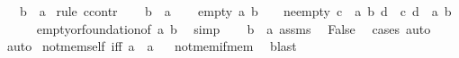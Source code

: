 \begin{isabellebody}
\ \ \ {\isachardoublequoteopen}b\ {\isasymnotin}\ a{\isachardoublequoteclose}\isanewline
%
\isadelimproof
%
\endisadelimproof
%
\isatagproof
{}\isamarkupfalse%
\ {\isacharparenleft}{\kern0pt}rule\ ccontr{\isacharparenright}{\kern0pt}\isanewline
\ \ \isamarkupfalse%
\ {\isachardoublequoteopen}b\ {\isasymin}\ a{\isachardoublequoteclose}\isanewline
\ \ \isamarkupfalse%
\ {\isacharparenleft}{\kern0pt}empty{\isacharparenright}{\kern0pt}\ {\isachardoublequoteopen}{\isacharbraceleft}{\kern0pt}a{\isacharcomma}{\kern0pt}\ b{\isacharbraceright}{\kern0pt}\ {\isacharequal}{\kern0pt}\ {\isacharbraceleft}{\kern0pt}{\isacharbraceright}{\kern0pt}{\isachardoublequoteclose}\ {\isacharbar}{\kern0pt}\ {\isacharparenleft}{\kern0pt}ne{\isacharunderscore}{\kern0pt}empty{\isacharparenright}{\kern0pt}\ {\isachardoublequoteopen}{\isasymexists}c\ {\isasymin}\ {\isacharbraceleft}{\kern0pt}a{\isacharcomma}{\kern0pt}\ b{\isacharbraceright}{\kern0pt}{\isachardot}{\kern0pt}\ {\isasymforall}d\ {\isasymin}\ c{\isachardot}{\kern0pt}\ d\ {\isasymnotin}\ {\isacharbraceleft}{\kern0pt}a{\isacharcomma}{\kern0pt}\ b{\isacharbraceright}{\kern0pt}{\isachardoublequoteclose}\isanewline
\ \ \ \ \isamarkupfalse%
\ empty{\isacharunderscore}{\kern0pt}or{\isacharunderscore}{\kern0pt}foundation{\isacharbrackleft}{\kern0pt}of\ {\isachardoublequoteopen}{\isacharbraceleft}{\kern0pt}a{\isacharcomma}{\kern0pt}\ b{\isacharbraceright}{\kern0pt}{\isachardoublequoteclose}{\isacharbrackright}{\kern0pt}\ \isamarkupfalse%
\ simp\isanewline
\ \ \isamarkupfalse%
\ {\isacartoucheopen}b\ {\isasymin}\ a{\isacartoucheclose}\ assms\ \isamarkupfalse%
\ {\isachardoublequoteopen}False{\isachardoublequoteclose}\ \isamarkupfalse%
\ cases\ auto\isanewline
{}\isamarkupfalse%
\ auto%
\endisatagproof
{\isafoldproof}%
%
\isadelimproof
\isanewline
%
\endisadelimproof
\isanewline
{}\isamarkupfalse%
\ not{\isacharunderscore}{\kern0pt}mem{\isacharunderscore}{\kern0pt}self\ {\isacharbrackleft}{\kern0pt}iff{\isacharbrackright}{\kern0pt}{\isacharcolon}{\kern0pt}\ {\isachardoublequoteopen}a\ {\isasymnotin}\ a{\isachardoublequoteclose}%
\isadelimproof
\ %
\endisadelimproof
%
\isatagproof
{}\isamarkupfalse%
\ not{\isacharunderscore}{\kern0pt}mem{\isacharunderscore}{\kern0pt}if{\isacharunderscore}{\kern0pt}mem\ \isamarkupfalse%
\ blast%
\endisatagproof
{\isafoldproof}%
%
\isadelimproof
%
\endisadelimproof
\isanewline
\isanewline

\end{isabellebody}
